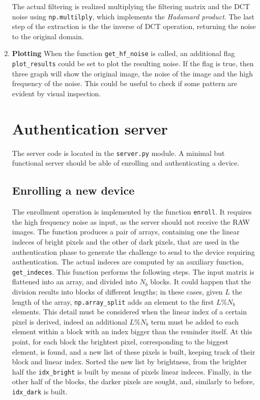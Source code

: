 \begin{enumerate}
        The actual filtering is realized multiplying the filtering matrix and the DCT noise using \texttt{np.multilply}, which implements the \emph{Hadamard product}. The last step of the extraction is the the inverse of DCT operation, returning the noise to the original domain.
  \item \textbf{Plotting}
        When the function \texttt{get\_hf\_noise} is called, an additional flag \texttt{plot\_results} could be set to plot the resulting noise. If the flag is true, then three graph will show the original image, the noise of the image and the high frequency of the noise. This could be useful to check if some pattern are evident by visual inspection.

        \section{Authentication server}\label{sec:authserver}
        The server code is located in the \texttt{server.py} module. A minimal but functional server should be able of enrolling and authenticating a device.

        \subsection{Enrolling a new device}\label{subsec:enrollment}
        The enrollment operation is implemented by the function \texttt{enroll}. It requires the high frequency noise as input, as the server should not receive the RAW images. The function produces a pair of arrays, containing one the linear indeces of bright pixels and the other of dark pixels, that are used in the authentication phase to generate the challenge to send to the device requiring authentication.
        The actual indeces are computed by an auxiliary function, \texttt{get\_indeces}. This function performs the following steps. The input matrix is flattened into an array, and divided into $N_{b}$ blocks.
        It could happen that the division results into blocks of different lengths; in these cases, given $L$ the length of the array, \texttt{np.array\_split} adds an element to the first $L \% N_{b}$ elements. This detail must be considered when the linear index of a certain pixel is derived, indeed an additional $L \% N_{b}$ term must be added to each element within a block with an index bigger than the reminder itself.
        At this point, for each block the brightest pixel, corresponding to the biggest element, is found, and a new list of these pixels is built, keeping track of their block and linear index.
        Sorted the new list by brightness, from the brighter half the \texttt{idx\_bright}
        is built by means of pixels linear indeces. Finally, in the other half of the blocks, the darker pixels are sought, and, similarly to before, \texttt{idx\_dark} is built.


\end{enumerate}
